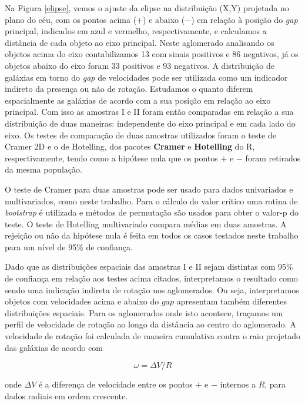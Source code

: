 Na Figura \ref{elipse}, vemos o ajuste da elipse na distribuição (X,Y) projetada no plano do céu, com os pontos acima ($+$) e abaixo ($-$) em relação à posição do \textit{gap} principal, indicados em azul e vermelho, respectivamente, e calculamos a distância de cada objeto ao eixo principal. Neste aglomerado analisando os objetos acima do eixo contabilizamos 13 com sinais positivos e 86 negativos, já os objetos abaixo do eixo foram 33 positivos e 93 negativos. A distribuição de galáxias em torno do \textit{gap} de velocidades pode ser utilizada como um indicador indireto da presença ou não de rotação. Estudamos o quanto diferem espacialmente as galáxias de acordo com a sua posição em relação ao eixo principal. Com isso as amostras I e II foram então comparadas em relação a sua distribuição de duas maneiras: independente do eixo principal e em cada lado do eixo. Os testes de comparação de duas amostras utilizados foram o teste de Cramer 2D e o de Hotelling, dos pacotes \textbf{ Cramer} e \textbf{ Hotelling} do R, respectivamente, tendo como a hipótese nula que os pontos $+$ e $-$ foram retirados da mesma população. 

O teste de Cramer para duas amostras pode ser usado para dados univariados e multivariados, como neste trabalho. Para o cálculo do valor crítico uma rotina de \textit{bootstrap} é utilizada e métodos de permutação são usados para obter o valor-p do teste. O teste de Hotelling multivariado compara médias em duas amostras. A rejeição ou não da hipótese nula é feita em todos os casos testados neste trabalho para um nível de 95\% de confiança. 

Dado que as distribuições espaciais das amostras  I e II sejam distintas com 95\% de confiança em relação aos testes acima citados, interpretamos o resultado como sendo uma indicação indireta de rotação nos aglomerados. Ou seja, interpretamos objetos com velocidades acima e abaixo do $gap$ apresentam também
diferentes distribuições espaciais.
Para os aglomerados onde isto acontece, traçamos um perfil de velocidade de rotação ao longo da distância ao centro do aglomerado. A velocidade de rotação foi calculada de maneira cumulativa contra o raio projetado das galáxias de acordo com

\begin{equation}
\omega= \Delta V/R
\label{eq:eq10}
\end{equation}

\noindent onde $\Delta V$ é a diferença de velocidade entre os pontos $+$ e $-$ internos a $R$, para dados radiais em ordem crescente.

